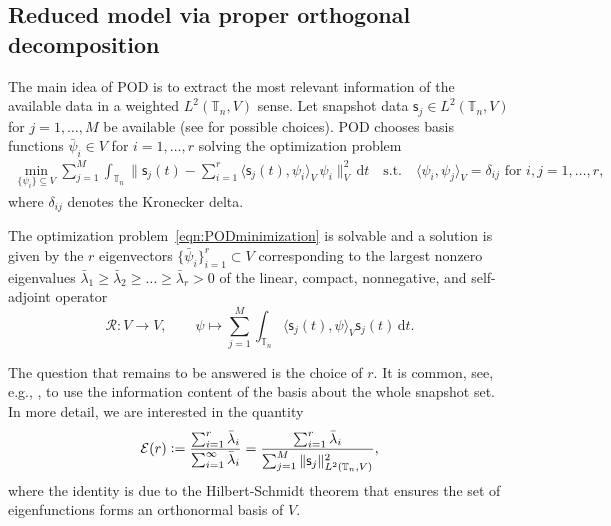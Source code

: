 \documentclass[reqno]{amsart}
\newcommand{\timeInt}{\mathbb{T}}
\newcommand{\dt}{\,\mathrm{d}t}
\newcommand{\stateDimRed}{r}
\newcommand{\basis}{\psi}
\newcommand{\PODbasis}{\bar{\basis}}
\newcommand{\PODeigVal}{\bar{\lambda}}
\newcommand{\PODweight}{\alpha}
\newcommand{\calE}{\mathcal{E}}
\newcommand{\calR}{\mathcal{R}}
\newcommand{\snapshots}{\mathsf s}
\newcommand{\nrSnapshots}{M}
\newcommand{\abbr}[1]{\textsf{#1}\xspace}
\newcommand{\POD}{\abbr{POD}} %
\begin{document}
\subsection{Reduced model via proper orthogonal decomposition}
\label{subsec:POD}
The main idea of \POD is to extract the most relevant information of the available data in a weighted $L^2(\timeInt_n,V)$ sense. Let snapshot data $\snapshots_j\in L^2(\timeInt_n,V)$ for $j=1,\ldots,M$ be available (see  for possible choices).
\POD chooses basis functions $\PODbasis_i\in V$ for $i=1,\ldots,\stateDimRed$ solving the optimization problem
\begin{align}
    \label{eqn:PODminimization}
     \min_{\{\basis_i\}\subseteq V} \sum_{j=1}^{\nrSnapshots} \int_{\timeInt_n}\bigg\|\snapshots_j(t)-\sum_{i=1}^{\stateDimRed} \langle  \snapshots_j(t), \basis_i\rangle_V \,\basis_i \bigg\|^2_V \dt
    \quad \text{s.t.}\quad \langle \basis_i, \basis_j\rangle_V = \delta_{ij} \text{ for }i,j = 1,\ldots, \stateDimRed,
\end{align}
where $\delta_{ij}$ denotes the Kronecker delta.
%
\begin{theorem}
    The optimization problem~\eqref{eqn:PODminimization} is solvable and a solution is given by the $\stateDimRed$ eigenvectors $\{\PODbasis_i\}_{i=1}^r\subset V$ corresponding to the largest nonzero eigenvalues $\PODeigVal_1\ge\PODeigVal_2\ge\ldots\ge\PODeigVal_r>0$ of the linear, compact, nonnegative, and self-adjoint operator
    \begin{equation*}
        \calR\colon V\to V, \qquad \basis \mapsto \sum_{j=1}^{M}  \int_{\timeInt_n}\langle \snapshots_j(t),\basis\rangle_{V} \snapshots_j(t) \dt.
    \end{equation*}
\end{theorem}
%
The question that remains to be answered is the choice of $\stateDimRed$. It is common, see, e.g., \cite{GubV17}, to use the information content of the basis about the whole snapshot set. In more detail, we are interested in the quantity
%
\begin{align}
    \label{eqn:POD:basisEnergy}
    \calE(\stateDimRed) \vcentcolon= \frac{\sum_{i=1}^\stateDimRed \PODeigVal_i}{\sum_{i=1}^\infty  \PODeigVal_i} = \frac{\sum_{i=1}^\stateDimRed \PODeigVal_i}{\sum_{j=1}^{\nrSnapshots} 
    \|\snapshots_j\|_{L^2(\timeInt_n,V)}^2},
\end{align}
%
where the identity is due to the Hilbert-Schmidt theorem that ensures the set of eigenfunctions forms an orthonormal basis of $V$.
\end{document}
